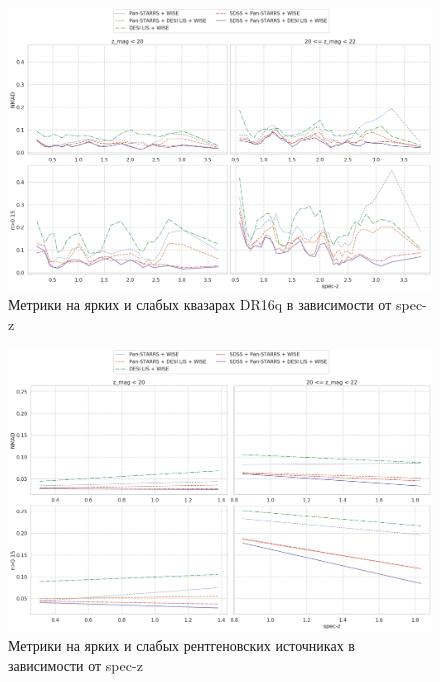 \documentclass[fleqn,usenatbib]{mnras}
\begin{document}
\begin{figure}
    \centering
    \includegraphics[width=0.9\linewidth]{images/class-qso-dr16q.png}
    \caption{Метрики на ярких и слабых квазарах DR16q в зависимости от spec-z}
    \label{fig:class-qso-dr16q}
\end{figure}

\begin{figure}
    \centering
    \includegraphics[width=0.9\linewidth]{images/class-xray-s82x.png}
    \caption{Метрики на ярких и слабых рентгеновских источниках в зависимости от spec-z}
    \label{fig:class-xray-s82x}
\end{figure}
\end{document}

